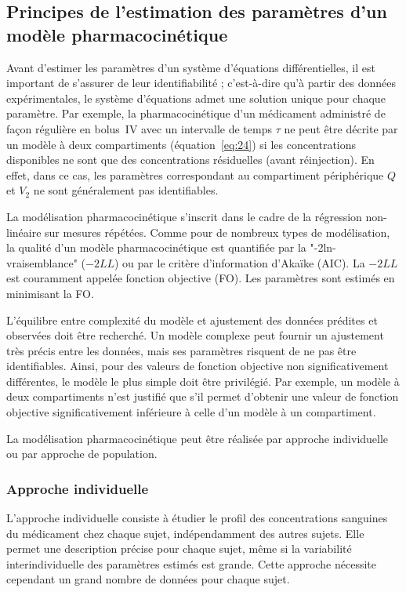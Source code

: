 \subsection{Principes de l'estimation des paramètres d'un modèle pharmacocinétique}
Avant d'estimer les paramètres d'un système d'équations différentielles, il est important de s'assurer de leur identifiabilité ; c'est-à-dire qu'à partir des données expérimentales, le système d'équations admet une solution unique pour chaque paramètre. Par exemple, la pharmacocinétique d'un médicament administré de façon régulière en bolus~\gls{IV} avec un intervalle de temps $\tau$ ne peut être décrite par un modèle à deux compartiments (équation~\ref{eq:24}) si les concentrations disponibles ne sont que des concentrations résiduelles (avant réinjection). En effet, dans ce cas, les paramètres correspondant au compartiment périphérique $Q$ et $V_2$ ne sont généralement pas identifiables.

La modélisation pharmacocinétique s'inscrit dans le cadre de la régression non-linéaire sur mesures répétées. Comme pour de nombreux types de modélisation, la qualité d'un modèle pharmacocinétique est quantifiée par la "-2ln-vraisemblance" ($-2LL$) ou par le critère d'information d'Akaïke (AIC). La $-2LL$ est couramment appelée fonction objective (FO). Les paramètres sont estimés en minimisant la FO. 

L'équilibre entre complexité du modèle et ajustement des données prédites et observées doit être recherché. Un modèle complexe peut fournir un ajustement très précis entre les données, mais ses paramètres risquent de ne pas être identifiables. Ainsi, pour des valeurs de fonction objective non significativement différentes, le modèle le plus simple doit être privilégié. Par exemple, un modèle à deux compartiments n'est justifié que s'il permet d'obtenir une valeur de fonction objective significativement inférieure à celle d'un modèle à un compartiment.

La modélisation pharmacocinétique peut être réalisée par approche individuelle ou par approche de population. 

\subsubsection{Approche individuelle}
L'approche individuelle consiste à étudier le profil des concentrations sanguines du médicament chez chaque sujet, indépendamment des autres sujets. Elle permet une description précise pour chaque sujet, même si la variabilité interindividuelle des paramètres estimés est grande. Cette approche nécessite cependant un grand nombre de données pour chaque sujet.

